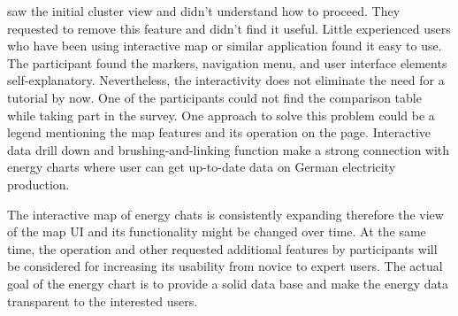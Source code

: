 saw the initial cluster view and didn’t understand how to proceed. They requested to remove this feature and didn’t find it useful. Little experienced users who have been using interactive map or similar application found it easy to use. The participant found the markers, navigation menu, and user interface elements self-explanatory. Nevertheless, the interactivity does not eliminate the need for a tutorial by now. One of the participants could not find the comparison table while taking part in the survey. One approach to solve this problem could be a legend mentioning the map features and its operation on the page. Interactive data drill down and brushing-and-linking function make a strong connection with energy charts where user can get up-to-date data on German electricity production. 

The interactive map of energy chats is consistently expanding therefore the view of the map UI and its functionality might be changed over time. At the same time, the operation and other requested additional features by participants will be considered for increasing its usability from novice to expert users. The actual goal of the energy chart is to provide a solid data base and make the energy data transparent to the interested users.  

